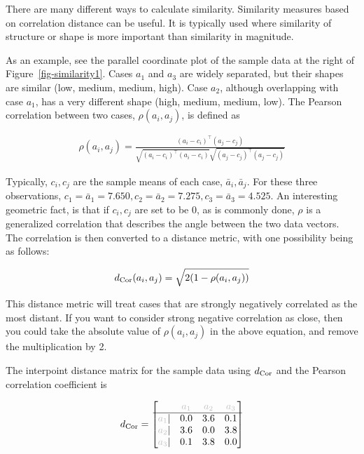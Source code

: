 \documentclass[
  letterpaper,
]{krantz}
\begin{document}
There are many different ways to calculate similarity. Similarity
measures based on correlation distance can be useful. It is typically
used where similarity of structure or shape is more important than
similarity in magnitude.


As an example, see the parallel coordinate plot of the sample data at
the right of Figure~\ref{fig-similarity1}. Cases \(a_1\) and \(a_3\) are
widely separated, but their shapes are similar (low, medium, medium,
high). Case \(a_2\), although overlapping with case \(a_1\), has a very
different shape (high, medium, medium, low). The Pearson correlation
between two cases, \(\rho(a_i,a_j)\), is defined as

\begin{align*}
\rho(a_i,a_j) = \frac{(a_i-c_i)^\top(a_j-c_j)}
{\sqrt{(a_i-c_i)^\top(a_i-c_i)} \sqrt{(a_j-c_j)^\top(a_j-c_j)}}
\label{corc}
\end{align*}

\noindent Typically, \(c_i, c_j\) are the sample means of each case,
\(\bar{a}_i,\bar{a}_j\). For these three observations,
\(c_1=\bar{a}_1=7.650, c_2=\bar{a}_2=7.275, c_3=\bar{a}_3=4.525\). An
interesting geometric fact, is that if \(c_i, c_j\) are set to be 0, as
is commonly done, \(\rho\) is a generalized correlation that describes
the angle between the two data vectors. The correlation is then
converted to a distance metric, with one possibility being as follows:

\begin{align*}
d_{\rm Cor}(a_i,a_j) = \sqrt{2(1-\rho(a_i,a_j))}
\end{align*}

This distance metric will treat cases that are strongly negatively
correlated as the most distant. If you want to consider strong negative
correlation as close, then you could take the absolute value of
\(\rho(a_i,a_j)\) in the above equation, and remove the multiplication
by 2.

The interpoint distance matrix for the sample data using \(d_{\rm Cor}\)
and the Pearson correlation coefficient is

\begin{align*}
d_{\rm Cor} = \begin{bmatrix}
& {\color{grey} a_1} & {\color{grey} a_2} & {\color{grey} a_3} \\\hline
{\color{grey} a_1} | & 0.0 & 3.6 & 0.1 \\
{\color{grey} a_2} | & 3.6 & 0.0 & 3.8 \\
{\color{grey} a_3} | & 0.1 & 3.8 & 0.0
\end{bmatrix}
\end{align*}
\end{document}
